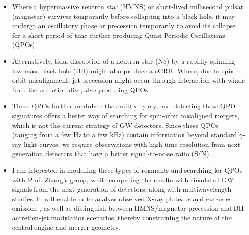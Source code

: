 \begin{itemize}
    \itemsep0em 
    \item Where a hypermassive neutron star (HMNS) \cite{Chirenti_2023} or short-lived millisecond pulsar (magnetar) 
    \cite{Chen_2025} survives temporarily before collapsing into a black hole, it may undergo an oscillatory phase or precession temporarily to avoid its collapse for a short period of time further producing Quasi-Periodic Oscillations (QPOs).
    
    \item Alternatively, tidal disruption of a neutron star (NS) by a rapidly spinning low-mass black hole (BH) might also produce a sGRB. Where, due to spin-orbit misalignment, jet precession might occur through interaction with winds from the accretion disc, also producing QPOs \cite{Li__2023} \cite{Chen_2024}. 
    
    \item These QPOs further modulate the emitted $\gamma$-ray, and detecting these QPO signatures offers a better way of searching for spin-orbit misaligned mergers, which is not the current strategy of GW detectors. Since these QPOs (ranging from a few Hz to a few kHz) contain information beyond standard $\gamma$-ray light curves, we require observations with high time resolution from next-generation detectors that have a better signal-to-noise ratio (S/N).
    \item I am interested in modelling these types of remnants and searching for QPOs with Prof. Zhang's group, while comparing the results with simulated GW signals from the next generation of detectors, along with multiwavelength studies. It will enable us to analyse observed X-ray plateaus and extended emission  \cite{Rowlinson_2013}, as well as distinguish between HMNS/magnetar precession and BH accretion-jet modulation scenarios, thereby constraining the nature of the central engine and merger geometry.
\end{itemize}

\subsection*{\fontsize{12 pt}{10 pt}\selectfont{Pillar 2: Multi-Wavelength and Multi-Messenger Study :}}

